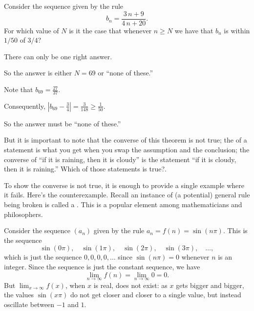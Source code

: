 \documentclass{ximera}
\begin{document}
\begin{question}
  Consider the sequence given by the rule \[b_{n} = \frac{ 3 \, n + 9 }{ 4 \, n + 20 }.\]  For which value of $N$ is it the case that whenever $n \ge N$ we have that $b_{n}$ is within $1/50$ of $3/4$?

    \begin{hint}
      There can only be one right answer.
    \end{hint}
    \begin{hint}
      So the answer is either $N = 69$ or ``none of these.''
    \end{hint}
    \begin{hint}
      Note that $b_{69} = \frac{27}{37}$.
    \end{hint}
    \begin{hint}
      Consequently, $\left| b_{69} -  \frac{3}{4} \right| = \frac{3}{148} \ge \frac{1}{50}$.
    \end{hint}
    \begin{hint}
      So the answer must be ``none of these.''
    \end{hint}

    \begin{multipleChoice}
    \end{multipleChoice}

\end{question}

But it is important to note that the converse of this theorem is not
true; \label{sidenote:raining-converse}the  of a
statement is what you get when you swap the assumption and the
conclusion; the converse of ``if it is raining, then it is cloudy'' is
the statement ``if it is cloudy, then it is raining.''  Which of those
statements is true?.

To show the converse is not true, it is enough to provide a single
example where it fails.  Here's the counterexample.  Recall an
instance of (a potential) general rule being broken is called a
.  This is a popular element among
mathematicians and philosophers.

\begin{example}
  Consider the sequence $(a_n)$ given by the rule $a_n = f(n)=\sin(n\pi)$.  This is the sequence
$$
  \sin(0\pi),\quad \sin(1\pi),\quad\sin(2\pi),\quad\sin(3\pi),\quad\ldots,
$$
which is just the sequence $0, 0, 0, 0, \ldots$ since $\sin(n\pi)=0$
whenever $n$ is an integer.  Since the sequence is just the constant sequence, we have
$$
\lim_{n\to\infty} f(n)= \lim_{n\to\infty} 0 = 0. 
$$But $\lim_{x\to\infty}f(x)$, when $x$ is real, does not exist: as $x$ gets
bigger and bigger, the values $\sin(x\pi)$ do not get closer and
closer to a single value, but instead oscillate between $-1$ and $1$.
\end{example} 
\end{document}
